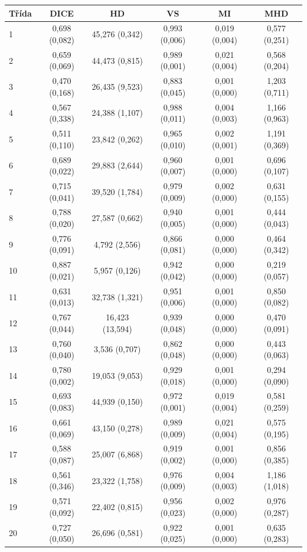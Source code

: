 \begin{tabular}{l c c c c c}
 \hline
Třída & DICE & HD & VS & MI & MHD \\ \hline
1 & 0,698 (0,082) & 45,276 (0,342) & 0,993 (0,006) & 0,019 (0,004) & 0,577 (0,251) \\
2 & 0,659 (0,069) & 44,473 (0,815) & 0,989 (0,001) & 0,021 (0,004) & 0,568 (0,204) \\
3 & 0,470 (0,168) & 26,435 (9,523) & 0,883 (0,045) & 0,001 (0,000) & 1,203 (0,711) \\
4 & 0,567 (0,338) & 24,388 (1,107) & 0,988 (0,011) & 0,004 (0,003) & 1,166 (0,963) \\
5 & 0,511 (0,110) & 23,842 (0,262) & 0,965 (0,010) & 0,002 (0,001) & 1,191 (0,369) \\
6 & 0,689 (0,022) & 29,883 (2,644) & 0,960 (0,007) & 0,001 (0,000) & 0,696 (0,107) \\
7 & 0,715 (0,041) & 39,520 (1,784) & 0,979 (0,009) & 0,002 (0,000) & 0,631 (0,155) \\
8 & 0,788 (0,020) & 27,587 (0,662) & 0,940 (0,005) & 0,001 (0,000) & 0,444 (0,043) \\
9 & 0,776 (0,091) & 4,792 (2,556) & 0,866 (0,081) & 0,000 (0,000) & 0,464 (0,342) \\
10 & 0,887 (0,021) & 5,957 (0,126) & 0,942 (0,042) & 0,000 (0,000) & 0,219 (0,057) \\
11 & 0,631 (0,013) & 32,738 (1,321) & 0,951 (0,006) & 0,001 (0,000) & 0,850 (0,082) \\
12 & 0,767 (0,044) & 16,423 (13,594) & 0,939 (0,048) & 0,000 (0,000) & 0,470 (0,091) \\
13 & 0,760 (0,040) & 3,536 (0,707) & 0,862 (0,048) & 0,000 (0,000) & 0,443 (0,063) \\
14 & 0,780 (0,002) & 19,053 (9,053) & 0,929 (0,018) & 0,001 (0,000) & 0,294 (0,090) \\
15 & 0,693 (0,083) & 44,939 (0,150) & 0,972 (0,001) & 0,019 (0,004) & 0,581 (0,259) \\
16 & 0,661 (0,069) & 43,150 (0,278) & 0,989 (0,009) & 0,021 (0,004) & 0,575 (0,195) \\
17 & 0,588 (0,087) & 25,007 (6,868) & 0,919 (0,002) & 0,001 (0,000) & 0,856 (0,385) \\
18 & 0,561 (0,346) & 23,322 (1,758) & 0,976 (0,009) & 0,004 (0,003) & 1,186 (1,018) \\
19 & 0,571 (0,092) & 22,402 (0,815) & 0,956 (0,023) & 0,002 (0,000) & 0,976 (0,287) \\
20 & 0,727 (0,050) & 26,696 (0,581) & 0,922 (0,025) & 0,001 (0,000) & 0,635 (0,283) \\

\end{tabular}
